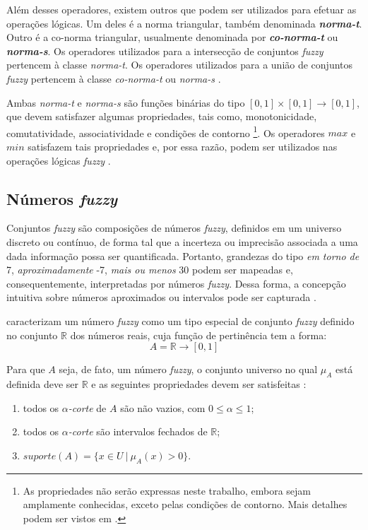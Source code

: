 Além desses operadores, existem outros que podem ser utilizados para efetuar as operações lógicas. Um deles é a norma triangular, também denominada \textbf{\emph{norma-t}}. Outro é a co-norma triangular, usualmente denominada por \textbf{\emph{co-norma-t}} ou \textbf{\emph{norma-s}}. Os operadores utilizados para a intersecção de conjuntos \emph{fuzzy} pertencem à classe \emph{norma-t}. Os operadores utilizados para a união de conjuntos \emph{fuzzy} pertencem à classe \emph{co-norma-t} ou \emph{norma-s} \citep{zimmermann:01}.

Ambas \emph{norma-t} e \emph{norma-s} são funções binárias do tipo $[0, 1] \times [0, 1] \rightarrow [0, 1]$, que devem satisfazer algumas propriedades, tais como, monotonicidade, comutatividade, associatividade e condições de contorno \footnote{As propriedades não serão expressas neste trabalho, embora sejam amplamente conhecidas, exceto pelas condições de contorno. Mais detalhes podem ser vistos em \citet{zimmermann:01}.}. Os operadores $max$ e $min$ satisfazem tais propriedades e, por essa razão, podem ser utilizados nas operações lógicas \emph{fuzzy} \citep{zimmermann:01}.


\subsection{Números \emph{fuzzy}}
\label{sec:numeros_fuzzy}
Conjuntos \emph{fuzzy} são composições de números \emph{fuzzy}, definidos em um universo discreto ou contínuo, de forma tal que a incerteza ou imprecisão associada a uma dada informação possa ser quantificada. Portanto, grandezas do tipo \emph{em torno de} 7, \emph{aproximadamente} -7, \emph{mais ou menos} 30 podem ser mapeadas e, consequentemente, interpretadas por números \emph{fuzzy}. Dessa forma, a concepção intuitiva sobre números aproximados ou intervalos pode ser capturada \citep{klir:95}.

\citet{klir:95} caracterizam um número \emph{fuzzy} como um tipo especial de conjunto \emph{fuzzy} definido no conjunto $\mathbb{R}$ dos números reais, cuja função de pertinência tem a forma:
\begin{equation}
\label{eq:fuzzy_numero_reais}
  A = \mathbb{R} \rightarrow [0, 1]
\end{equation}

Para que $A$ seja, de fato, um número \emph{fuzzy}, o conjunto universo no qual $\mu_A$ está definida deve ser $\mathbb{R}$ e as seguintes propriedades devem ser satisfeitas \citep{barros:06}:
\begin{enumerate}[label=(\roman*)]
\item todos os $\alpha$\emph{-corte} de $A$ são não vazios, com $0 \leq \alpha \leq 1$;
\item todos os $\alpha$\emph{-corte} são intervalos fechados de $\mathbb{R}$;
\item $suporte(A) = \{x \in U \ |\ \mu_A(x) > 0\}$.
\end{enumerate}


